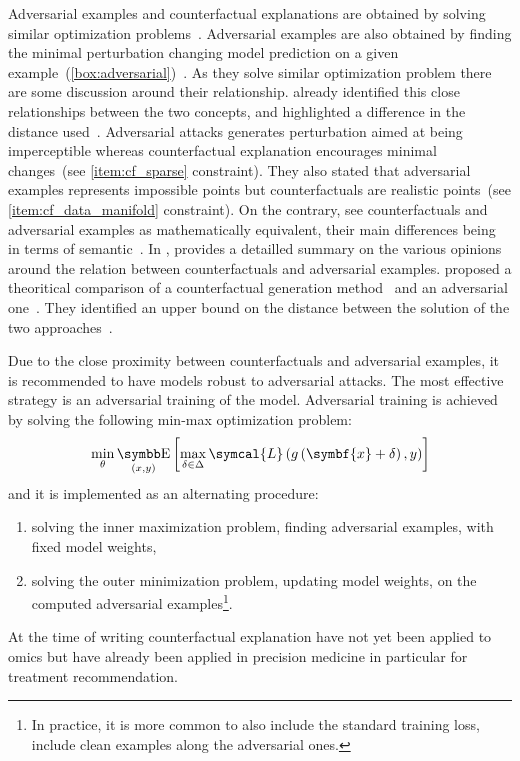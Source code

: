 \documentclass[../main.tex]{subfiles}
\begin{document}
	Adversarial examples and counterfactual explanations are obtained by solving similar optimization problems~\cite{Pawelczyk2021ExploringCE,Freiesleben2021}. 
	Adversarial examples are also obtained by finding the minimal perturbation changing model prediction on a given example~(\cref{box:adversarial})~\cite{Szegedy2013IntriguingPO}. 
	As they solve similar optimization problem there are some discussion around their relationship. 
	\citeauthor{wachter2017counterfactual} already identified this close relationships between the two concepts, and highlighted a difference in the distance used~\cite{wachter2017counterfactual}. 
	Adversarial attacks generates perturbation aimed at being imperceptible whereas counterfactual explanation encourages minimal changes~(see \ref{item:cf_sparse} constraint).
	They also stated that adversarial examples represents impossible points but counterfactuals are realistic points~(see \ref{item:cf_data_manifold} constraint). 
	On the contrary, \citeauthor{browne2020} see counterfactuals and adversarial examples as mathematically equivalent, their main differences being in terms of semantic~\cite{browne2020}. 
	In \cite[][8]{Freiesleben2021}, \citeauthor{Freiesleben2021} provides a detailled summary on the various opinions around the relation between counterfactuals and adversarial examples. 
	\citeauthor{Pawelczyk2021ExploringCE} proposed a theoritical comparison of a counterfactual generation method~\cite{wachter2017counterfactual} and an adversarial one~\cite{Carlini2016TowardsET}. 
	They identified an upper bound on the distance between the solution of the two approaches~\cite{Pawelczyk2021ExploringCE}. 

	Due to the close proximity between counterfactuals and adversarial examples, it is recommended to have models robust to adversarial attacks. 
	The most effective strategy is an adversarial training of the model. 
	Adversarial training is achieved by solving the following min-max optimization problem:
	\begin{equation}
		\min_{\theta} \E_{(x,y)}\left[\max_{\delta \in \Delta} \symcal{L}\left(g\left(\symbf{x}+\delta\right), y \right)  \right]
	\end{equation}
	and it is implemented as an alternating procedure: 
	\begin{enumerate}
		\item solving the inner maximization problem, \ie{}finding adversarial examples, with fixed model weights,
		\item solving the outer minimization problem, \ie{}updating model weights, on the computed adversarial examples\footnote{In practice, it is more common to also include the standard training loss, \ie{}include clean examples along the adversarial ones.}.
	\end{enumerate}

	At the time of writing counterfactual explanation have not yet been applied to omics but have already been applied in precision medicine in particular for treatment recommendation. 
	
\end{document}
